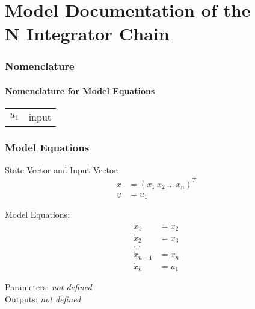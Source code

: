 \documentclass[10pt,a4paper]{article}
\begin{document}
	\part*{Model Documentation of the \\ N Integrator Chain} %
	
	
	\section{Nomenclature} %
	\subsection{Nomenclature for Model Equations} %
	
	\begin{tabular}{ll}
		$u_1$ & input		
	\end{tabular}	
	
	
	\section{Model Equations} %
	State Vector and Input Vector:	
	\begin{align*}
		\underline{x} &= (x_1 \ x_2 \ \dots \ x_n)^T \\
		\underline{u} &= u_1
	\end{align*}

	\noindent Model Equations:
	\begin{subequations}
	\begin{align}
		\dot{x}_1 &= x_2 	\\      %
		\dot{x}_2 &= x_3	\\
		... &				\\
		\dot{x}_{n-1} &= x_n \\
		\dot{x}_n &= u_1 
	\end{align}
	\end{subequations}

	\noindent
	Parameters:   \textit{\textlangle not defined\textrangle}
	\\
	Outputs: \textit{\textlangle not defined\textrangle}
	
		
\end{document}
